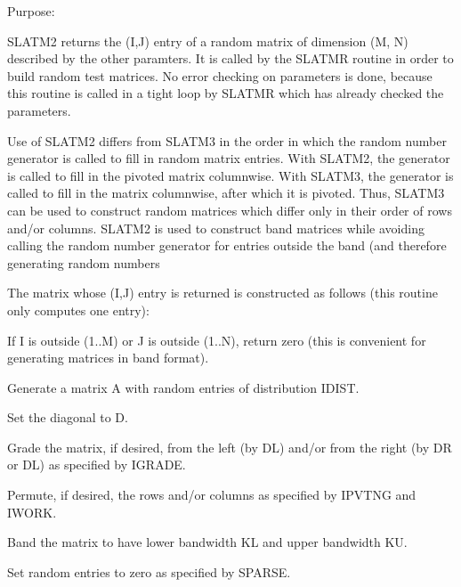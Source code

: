 \begin{DoxyParagraph}{Purpose\+: }
\begin{DoxyVerb}    SLATM2 returns the (I,J) entry of a random matrix of dimension
    (M, N) described by the other paramters. It is called by the
    SLATMR routine in order to build random test matrices. No error
    checking on parameters is done, because this routine is called in
    a tight loop by SLATMR which has already checked the parameters.

    Use of SLATM2 differs from SLATM3 in the order in which the random
    number generator is called to fill in random matrix entries.
    With SLATM2, the generator is called to fill in the pivoted matrix
    columnwise. With SLATM3, the generator is called to fill in the
    matrix columnwise, after which it is pivoted. Thus, SLATM3 can
    be used to construct random matrices which differ only in their
    order of rows and/or columns. SLATM2 is used to construct band
    matrices while avoiding calling the random number generator for
    entries outside the band (and therefore generating random numbers

    The matrix whose (I,J) entry is returned is constructed as
    follows (this routine only computes one entry):

      If I is outside (1..M) or J is outside (1..N), return zero
         (this is convenient for generating matrices in band format).

      Generate a matrix A with random entries of distribution IDIST.

      Set the diagonal to D.

      Grade the matrix, if desired, from the left (by DL) and/or
         from the right (by DR or DL) as specified by IGRADE.

      Permute, if desired, the rows and/or columns as specified by
         IPVTNG and IWORK.

      Band the matrix to have lower bandwidth KL and upper
         bandwidth KU.

      Set random entries to zero as specified by SPARSE.\end{DoxyVerb}
 
\end{DoxyParagraph}

